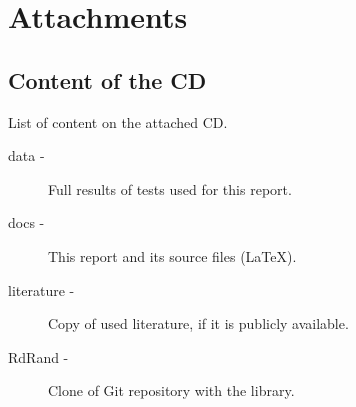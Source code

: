 \chapter{Attachments}\label{chap:attachments}
\section{Content of the CD}
List of content on the attached CD.

\begin{description}
  \item[data -] Full results of tests used for this report.
  \item[docs -] This report and its source files (LaTeX).
  \item[literature -] Copy of used literature, if it is publicly available.
  \item[RdRand -] Clone of Git repository with the library.
\end{description}


